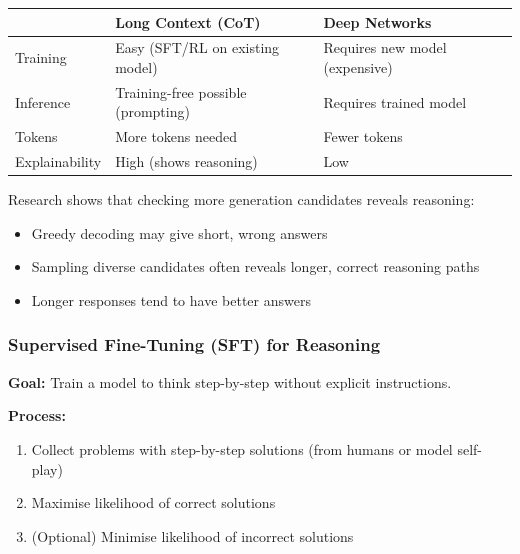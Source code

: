 \begin{defbox}
\begin{center}
\renewcommand{\arraystretch}{1.3}
\begin{tabular}{@{} l p{5cm} p{5cm} @{}}
\toprule
& \textbf{Long Context (CoT)} & \textbf{Deep Networks} \\
\midrule
Training & Easy (SFT/RL on existing model) & Requires new model (expensive) \\
Inference & Training-free possible (prompting) & Requires trained model \\
Tokens & More tokens needed & Fewer tokens \\
Explainability & High (shows reasoning) & Low \\
\bottomrule
\end{tabular}
\end{center}
\end{defbox}

\begin{tipbox}
Research shows that checking more generation candidates reveals reasoning:
\begin{itemize}
  \item Greedy decoding may give short, wrong answers
  \item Sampling diverse candidates often reveals longer, correct reasoning paths
  \item Longer responses tend to have better answers
\end{itemize}
\end{tipbox}

\bigseparator

\subsubsection{Supervised Fine-Tuning (SFT) for Reasoning}

\begin{defbox}
\textbf{Goal:} Train a model to think step-by-step without explicit instructions.

\textbf{Process:}
\begin{enumerate}
  \item Collect problems with step-by-step solutions (from humans or model self-play)
  \item Maximise likelihood of correct solutions
  \item (Optional) Minimise likelihood of incorrect solutions
\end{enumerate}
\end{defbox}

